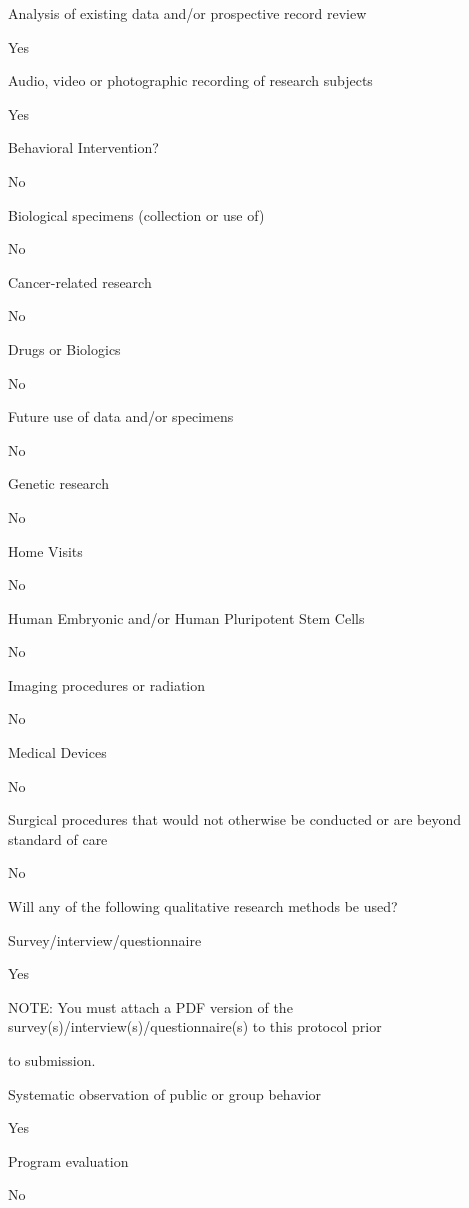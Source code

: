 \documentclass[10pt, letterpaper]{article}
\begin{document}
\begin{responsebox}

Analysis of existing data and/or prospective record review

Yes

Audio, video or photographic recording of research subjects

Yes

Behavioral Intervention?

\vspace{0.5em}

\vspace{0.5em}

No

Biological specimens (collection or use of)

No

Cancer-related research

No

Drugs or Biologics

No

Future use of data and/or specimens

No

Genetic research

No

Home Visits

No

Human Embryonic and/or Human Pluripotent Stem Cells

No

Imaging procedures or radiation

No

Medical Devices

No

Surgical procedures that would not otherwise be conducted or are beyond standard of care

No

\end{responsebox}

Will any of the following qualitative research methods be used?

\begin{responsebox}

Survey/interview/questionnaire

Yes

NOTE: You must attach a PDF version of the survey(s)/interview(s)/questionnaire(s) to this protocol prior

to submission.

Systematic observation of public or group behavior

Yes

Program evaluation

No

\end{responsebox}
\end{document}
